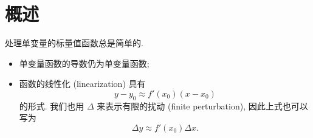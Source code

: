 \documentclass[10pt,UTF8]{book} %
\begin{document}
\makeatletter
\let\ps@plain\ps@empty
\makeatother

\mainmatter
\chapter{概述}

处理单变量的标量值函数总是简单的.

\begin{itemize}[itemsep=0pt]
    \item 单变量函数的导数仍为单变量函数;
    \item 函数的线性化 (linearization) 具有
    \[ y-y_0 \approx f'(x_0) (x - x_0) \]
    的形式. 我们也用 $\Delta$ 来表示有限的扰动 (finite perturbation),
    因此上式也可以写为
    \[ \Delta y \approx f'(x_0)\Delta x. \]
\end{itemize}



\onecolumn
\begin{thebibliography}{1}

\end{thebibliography}


\end{document}
